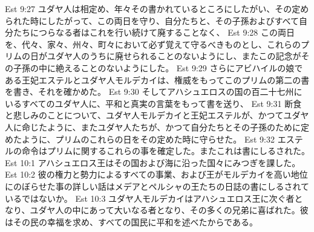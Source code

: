 Est 9:27  ユダヤ人は相定め、年々その書かれているところにしたがい、その定められた時にしたがって、この両日を守り、自分たちと、その子孫およびすべて自分たちにつらなる者はこれを行い続けて廃することなく、
Est 9:28  この両日を、代々、家々、州々、町々において必ず覚えて守るべきものとし、これらのプリムの日がユダヤ人のうちに廃せられることのないようにし、またこの記念がその子孫の中に絶えることのないようにした。
Est 9:29  さらにアビハイルの娘である王妃エステルとユダヤ人モルデカイは、権威をもってこのプリムの第二の書を書き、それを確かめた。
Est 9:30  そしてアハシュエロスの国の百二十七州にいるすべてのユダヤ人に、平和と真実の言葉をもって書を送り、
Est 9:31  断食と悲しみのことについて、ユダヤ人モルデカイと王妃エステルが、かつてユダヤ人に命じたように、またユダヤ人たちが、かつて自分たちとその子孫のために定めたように、プリムのこれらの日をその定めた時に守らせた。
Est 9:32  エステルの命令はプリムに関するこれらの事を確定した。またこれは書にしるされた。
Est 10:1  アハシュエロス王はその国および海に沿った国々にみつぎを課した。
Est 10:2  彼の権力と勢力によるすべての事業、および王がモルデカイを高い地位にのぼらせた事の詳しい話はメデアとペルシャの王たちの日誌の書にしるされているではないか。
Est 10:3  ユダヤ人モルデカイはアハシュエロス王に次ぐ者となり、ユダヤ人の中にあって大いなる者となり、その多くの兄弟に喜ばれた。彼はその民の幸福を求め、すべての国民に平和を述べたからである。


